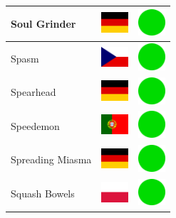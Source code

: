 \documentclass[12pt, a4paper, twoside]{report}
\begin{document}
\begin{center}
\begin{longtable}{|p{5cm}|p{2cm}|p{2cm}|}
 Soul Grinder                                               & \includegraphics[width=1cm]{4x3/de} &   \includegraphics[width=1cm]{likes/y} \\ \hline
 Spasm                                                      & \includegraphics[width=1cm]{4x3/cz} &   \includegraphics[width=1cm]{likes/y} \\ \hline
 Spearhead                                                  & \includegraphics[width=1cm]{4x3/de} &   \includegraphics[width=1cm]{likes/y} \\ \hline
 Speedemon                                                  & \includegraphics[width=1cm]{4x3/pt} &   \includegraphics[width=1cm]{likes/y} \\ \hline
 Spreading Miasma                                           & \includegraphics[width=1cm]{4x3/de} &   \includegraphics[width=1cm]{likes/y} \\ \hline
 Squash Bowels                                              & \includegraphics[width=1cm]{4x3/pl} &   \includegraphics[width=1cm]{likes/y} \\ \hline

\end{longtable}
\end{center}
\end{document}
